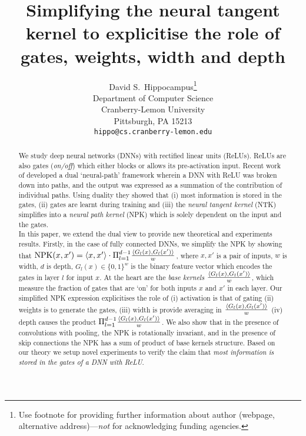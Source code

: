 \documentclass{article}
\title{Simplifying the neural tangent kernel to explicitise the role of gates, weights, width and depth}
\author{%
  David S.~Hippocampus\thanks{Use footnote for providing further information
    about author (webpage, alternative address)---\emph{not} for acknowledging
    funding agencies.} \\
  Department of Computer Science\\
  Cranberry-Lemon University\\
  Pittsburgh, PA 15213 \\
  \texttt{hippo@cs.cranberry-lemon.edu} \\
}
\begin{document}
\maketitle

\begin{abstract}
We study deep neural networks (DNNs) with rectified linear units (ReLUs). ReLUs are also gates (\emph{on/off}) which either blocks or allows its pre-activation input. Recent work of \cite{npk} developed a dual `neural-path' framework wherein a DNN with ReLU was broken down into paths, and the output was expressed as a summation of the contribution of individual paths. Using duality they showed that (i) most information is stored in the gates, (ii) gates are learnt during training and (iii) the \emph{neural tangent kernel} (NTK) simplifies into a \emph{neural path kernel} (NPK) which is solely dependent on the input and the gates.\\
In this paper, we extend the dual view to provide new theoretical and experiments results. Firstly, in the case of fully connected DNNs, we simplify the NPK by showing that $\text{NPK}(x,x')= \langle x,x'\rangle \cdot \Pi_{l=1}^{d-1} \frac{\langle G_l(x),G_l(x')\rangle}w$, where $x,x'$ is a pair of inputs, $w$ is width, $d$ is depth, $G_l(x)\in\{0,1\}^w$ is the binary feature vector which encodes the gates in layer $l$ for input $x$. At the heart are the \emph{base kernels} $\frac{\langle G_l(x),G_l(x')\rangle}w$, which measure the fraction of gates that are `on' for both inputs $x$ and $x'$ in each layer. Our simplified NPK expression explicitises the role of (i) activation is that of gating (ii) weights is to generate the gates, (iii) width is provide averaging in $\frac{\langle G_l(x),G_l(x')\rangle}w$ (iv) depth causes the product $\Pi_{l=1}^{d-1} \frac{\langle G_l(x),G_l(x')\rangle}w$. We also show that in the presence of convolutions with pooling, the NPK is rotationally invariant, and in the presence of skip connections the NPK has a sum of product of base kernels structure. Based on our theory we setup novel experiments to verify the claim that \emph{most information is stored in the gates of a DNN with ReLU}.
\end{abstract}
\end{document}
